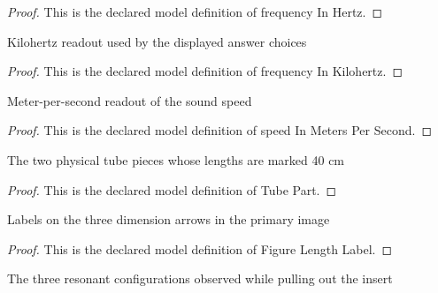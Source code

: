 \begin{proof}
  This is the declared model definition of frequency In Hertz.
\end{proof}
\begin{definition}
  \label{def:physics:phyx-mini-0184:phyxminiproblems-problemphyxmini0184-frequencyinkilohertz}
  Kilohertz readout used by the displayed answer choices
\end{definition}
\begin{proof}
  This is the declared model definition of frequency In Kilohertz.
\end{proof}
\begin{definition}
  \label{def:physics:phyx-mini-0184:phyxminiproblems-problemphyxmini0184-speedinmeterspersecond}
  Meter-per-second readout of the sound speed
\end{definition}
\begin{proof}
  This is the declared model definition of speed In Meters Per Second.
\end{proof}
\begin{definition}
  \label{def:physics:phyx-mini-0184:phyxminiproblems-problemphyxmini0184-tubepart}
  The two physical tube pieces whose lengths are marked 40 cm
\end{definition}
\begin{proof}
  This is the declared model definition of Tube Part.
\end{proof}
\begin{definition}
  \label{def:physics:phyx-mini-0184:phyxminiproblems-problemphyxmini0184-figurelengthlabel}
  Labels on the three dimension arrows in the primary image
\end{definition}
\begin{proof}
  This is the declared model definition of Figure Length Label.
\end{proof}
\begin{definition}
  \label{def:physics:phyx-mini-0184:phyxminiproblems-problemphyxmini0184-resonanceobservation}
  The three resonant configurations observed while pulling out the insert
\end{definition}
